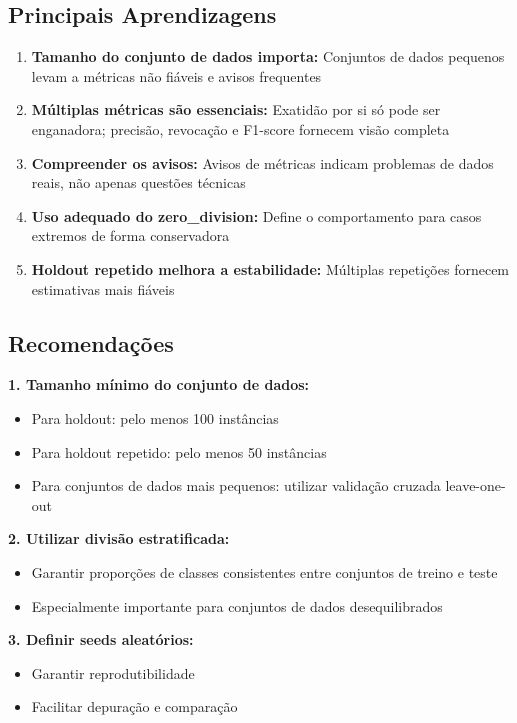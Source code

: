 \documentclass[12pt,a4paper]{article}
\begin{document}
\subsection{Principais Aprendizagens}

\begin{enumerate}
    \item \textbf{Tamanho do conjunto de dados importa:} Conjuntos de dados pequenos levam a métricas não fiáveis e avisos frequentes
    
    \item \textbf{Múltiplas métricas são essenciais:} Exatidão por si só pode ser enganadora; precisão, revocação e F1-score fornecem visão completa
    
    \item \textbf{Compreender os avisos:} Avisos de métricas indicam problemas de dados reais, não apenas questões técnicas
    
    \item \textbf{Uso adequado do zero\_division:} Define o comportamento para casos extremos de forma conservadora
    
    \item \textbf{Holdout repetido melhora a estabilidade:} Múltiplas repetições fornecem estimativas mais fiáveis
\end{enumerate}

\subsection{Recomendações}

\textbf{1. Tamanho mínimo do conjunto de dados:}
\begin{itemize}
    \item Para holdout: pelo menos 100 instâncias
    \item Para holdout repetido: pelo menos 50 instâncias
    \item Para conjuntos de dados mais pequenos: utilizar validação cruzada leave-one-out
\end{itemize}

\textbf{2. Utilizar divisão estratificada:}
\begin{itemize}
    \item Garantir proporções de classes consistentes entre conjuntos de treino e teste
    \item Especialmente importante para conjuntos de dados desequilibrados
\end{itemize}

\textbf{3. Definir seeds aleatórios:}
\begin{itemize}
    \item Garantir reprodutibilidade
    \item Facilitar depuração e comparação
\end{itemize}
\end{document}
